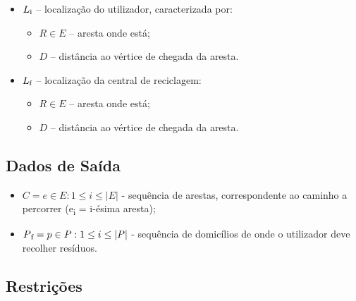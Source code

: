 \documentclass[article, a4paper, 12pt, oneside]{memoir}
\begin{document}
\begin{itemize}
\begin{itemize}
	\end{itemize} %

\item $L\textsubscript{i}$ – localização do utilizador, caracterizada por:

	\begin{itemize} %
	\item $R \in E$ – aresta onde está;
	\item $D$ – distância ao vértice de chegada da aresta.
	\end{itemize} %
	
\item $L\textsubscript{f}$ – localização da central de reciclagem:

	\begin{itemize} %
	\item $R \in E$ – aresta onde está;
	\item $D$ – distância ao vértice de chegada da aresta.
	\end{itemize} %
	
\end{itemize} %

\subsection{Dados de Saída}

\begin{itemize}
\item $C = {e \in E: 1 \leq i \leq |E|}$ - sequência de arestas, correspondente ao caminho a percorrer (e\textsubscript{i} = i-ésima aresta);
\item $P\textsubscript{f} = {p \in P: 1 \leq i \leq |P|}$ - sequência de domicílios de onde o utilizador deve recolher resíduos.
\end{itemize}

\subsection{Restrições}
\end{document}
